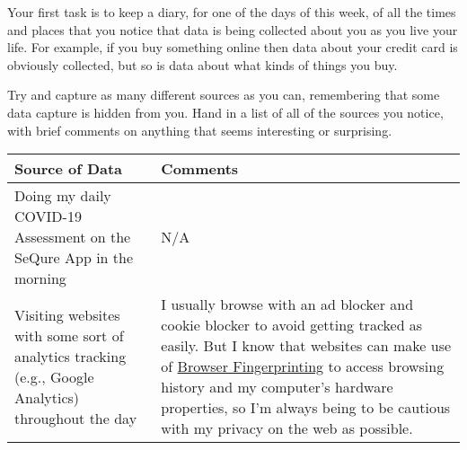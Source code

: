 \documentclass[
  coursecode={CMPE 251},
  assignmentname={Exercise 1},
  studentnumber=20053722,
  name={Bryan Hoang}
]{
  ltxanswer%
}
\begin{document}
  \begin{questions}
    \question[2]{}
    Your first task is to keep a diary, for one of the days of this week, of all the times and places that you notice that data is being collected about you as you live your life. For example, if you buy something online then data about your credit card is obviously collected, but so is data about what kinds of things you buy.

    Try and capture as many different sources as you can, remembering that some data capture is hidden from you. Hand in a list of all of the sources you notice, with brief comments on anything that seems interesting or surprising.
    \begin{solution}
      \captionsetup{type=table}
      \begin{center}
        \label{tab:1}
        \begin{tabularx}{\textwidth}{
            >{\raggedright\arraybackslash}X
            >{\raggedright\arraybackslash}X}
          \textbf{Source of Data}                                                                                                                         & \textbf{Comments}                                                                                                                                                                                                                                                                                                                                                                     \\
          \toprule
          Doing my daily COVID-19 Assessment on the SeQure App in the morning                                                                             & N/A                                                                                                                                                                                                                                                                                                                                                                                   \\
          \midrule
          Visiting websites with some sort of analytics tracking (e.g., Google Analytics) throughout the day                                              & I usually browse with an ad blocker and cookie blocker to avoid getting tracked as easily. But I know that websites can make use of \href{https://en.wikipedia.org/wiki/Device_fingerprint\#Browser_fingerprint}{Browser Fingerprinting} to access browsing history and my computer's hardware properties, so I'm always being to be cautious with my privacy on the web as possible. \\

\end{tabularx}
\end{center}
\end{solution}
\end{questions}
\end{document}
